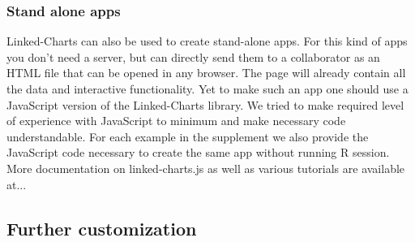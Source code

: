 \documentclass[twocolumn,10pt]{article}
\begin{document}
\subsubsection{Stand alone apps}
Linked-Charts can also be used to create stand-alone apps. For this kind of apps you don't need a server, but can directly send them to a collaborator as an HTML file that can be opened in any browser. The page will already contain all the data and interactive functionality. Yet to make such an app one should use a JavaScript version of the Linked-Charts library. We tried to make required level of experience with JavaScript to minimum and make necessary code understandable. For each example in the supplement we also provide the JavaScript code necessary to create the same app without running R session. More documentation on linked-charts.js as well as various tutorials are available at...

\subsection{Further customization}
\end{document}
